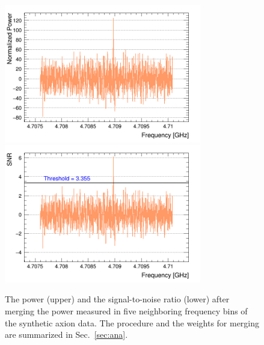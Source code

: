 \begin{figure}[htbp]                                                                                                  
    \centering                                                                                                                       
    \includegraphics[width=8.6cm]{figures/Power_GrandSpectrum_FaxionRun_AllSteps_Rescan_Merged_5bin_SG4_W201_LqWeight.png}
    \includegraphics[width=8.6cm]{figures/SNR_GrandSpectrum_FaxionRun_AllSteps_Rescan_Merged_5bin_SG4_W201_LqWeight.png}
    \caption{The power (upper) and the signal-to-noise ratio (lower) after 
merging the power measured in five neighboring frequency bins of the 
synthetic axion data. 
The procedure and the weights for merging 
are summarized in Sec.~\ref{sec:ana}.}                
\label{fig:faxionmerge}    
\end{figure}                       

   
